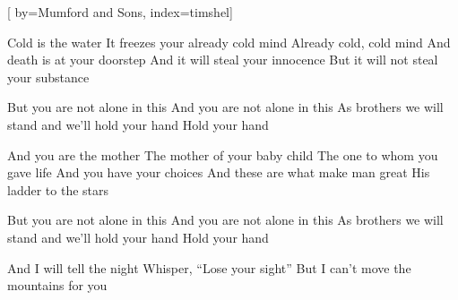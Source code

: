 
[%
    by={Mumford and Sons},
    index={timshel}]


    \label{timshel}

    \beginverse
        Cold is the water
        It freezes your already cold mind
        Already cold, cold mind
        And death is at your doorstep
        And it will steal your innocence
        But it will not steal your substance
    \endverse

    \beginchorus
        But you are not alone in this
        And you are not alone in this
        As brothers we will stand and we'll hold your hand
        Hold your hand
    \endchorus

    \beginverse
        And you are the mother
        The mother of your baby child
        The one to whom you gave life
        And you have your choices
        And these are what make man great
        His ladder to the stars
    \endverse

    \beginchorus
        But you are not alone in this
        And you are not alone in this
        As brothers we will stand and we'll hold your hand
        Hold your hand
    \endchorus

    \beginverse*
        And I will tell the night
        Whisper, ``Lose your sight''
        But I can't move the mountains for you
    \endverse
\endsong
